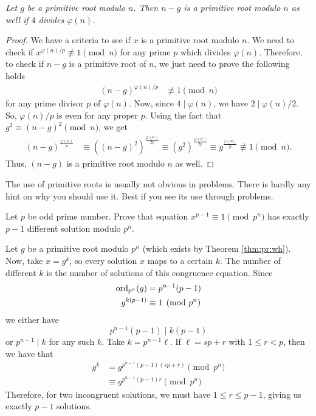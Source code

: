 \documentclass{subfile}
\begin{document}
	\begin{theorem}\slshape
		Let $g$ be a primitive root modulo $n$. Then $n-g$ is a primitive root modulo $n$ as well if $4$ divides $\varphi(n)$.
	\end{theorem}

	\begin{proof}
		We have a criteria to see if $x$ is a primitive root modulo $n$. We need to check if $x^{{\varphi(n)}/{p}}\not\equiv1\pmod n$ for any prime $p$ which divides $\varphi(n)$. Therefore, to check if $n-g$ is a primitive root of $n$, we just need to prove the following holds
		\begin{align*}
		(n-g)^{{\varphi(n)}/{p}} & \not\equiv1\pmod n
		\end{align*}
		for any prime divisor $p$ of $\varphi(n)$. Now, since $4 \mid \varphi(n)$, we have $2 \mid {\varphi(n)}/{2}$. So, ${\varphi(n)}/{p}$ is even for any proper $p$. Using the fact that $g^2\equiv(n-g)^2\pmod n$, we get
		\begin{align*}
		(n-g)^\frac{\varphi(n)}{p}   & \equiv\left((n-g)^2\right)^{\frac{\varphi(n)}{2p}} \equiv \left(g^2\right)^{\frac{\varphi(n)}{2p}}  \equiv g^{\frac{\varphi(n)}{p}} \not\equiv1\pmod n.
		\end{align*}
		Thus, $(n-g)$ is a primitive root modulo $n$ as well.
	\end{proof}
The use of primitive roots is usually not obvious in problems. There is hardly any hint on why you should use it. Best if you see its use through problems.
	\begin{problem}
		Let $p$ be odd prime number. Prove that equation  $x^{p-1}\equiv 1 \pmod{p^n}$ has exactly $p -1$ different solution modulo $p^{n}$.
	\end{problem}

	\begin{solution}[1]
		Let $g$ be a primitive root modulo $p^n$ (which exists by Theorem \ref{thm:pr:wh}). Now, take $x=g^k$, so every solution $x$ maps to a certain $k$. The number of different $k$ is the number of solutions of this congruence equation. Since
			\begin{align*}
				\operatorname{ord}_{p^n}(g)
					& =p^{n-1}(p-1)\\
				g^{k(p-1)}
					& \equiv1\pmod{p^n}
			\end{align*}
		we either have $$p^{n-1}(p-1) \mid k(p-1)$$ or $p^{n-1} \mid k$ for any such $k$. Take $k=p^{n-1}\ell$. If $\ell=sp+r$ with $1\leq r<p$, then we have that
			\begin{align*}
				g^k
					& =g^{p^{n-1}(p-1)(sp+r)}\pmod{p^{n}}\\
					& \equiv g^{p^{n-1}(p-1)r}\pmod{p^n}
			\end{align*}
		Therefore, for two incongruent solutions, we must have $1\leq r\leq p-1$, giving us exactly $p-1$ solutions.
	\end{solution}
\end{document}
